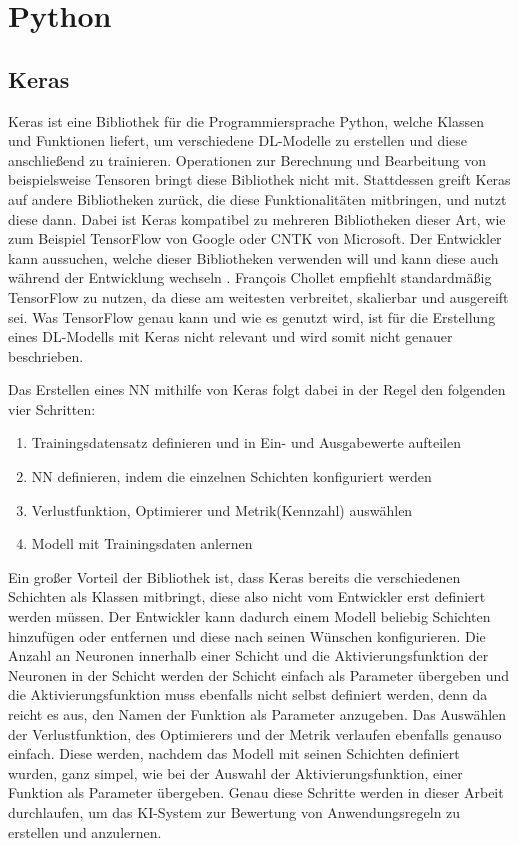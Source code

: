 \section{Python}
\label{chap:Python}


\subsection{Keras}
Keras ist eine Bibliothek für die Programmiersprache Python, welche Klassen und Funktionen liefert, um verschiedene \ac{DL}-Modelle zu erstellen
und diese anschließend zu trainieren. Operationen zur Berechnung und Bearbeitung von beispielsweise Tensoren bringt diese Bibliothek nicht mit.
Stattdessen greift Keras auf andere Bibliotheken zurück, die diese Funktionalitäten mitbringen, und nutzt diese dann. Dabei ist Keras kompatibel zu mehreren
Bibliotheken dieser Art, wie zum Beispiel TensorFlow von Google oder CNTK von Microsoft. Der Entwickler kann aussuchen, welche dieser Bibliotheken
verwenden will und kann diese auch während der Entwicklung wechseln \cite[vgl. S.89ff.]{DL_PY}. François Chollet empfiehlt standardmäßig TensorFlow zu nutzen, da diese 
\glqq am weitesten verbreitet, skalierbar und ausgereift\grqq{}\cite[S.91]{DL_PY} sei. Was TensorFlow genau kann und wie es genutzt wird, ist für die Erstellung eines
\ac{DL}-Modells mit Keras nicht relevant und wird somit nicht genauer beschrieben.

Das Erstellen eines \ac{NN} mithilfe von Keras folgt dabei in der Regel den folgenden vier Schritten:
\begin{enumerate}
    \item Trainingsdatensatz definieren und in Ein- und Ausgabewerte aufteilen \cite[vgl. S.92.]{DL_PY}
    \item \ac{NN} definieren, indem die einzelnen Schichten konfiguriert werden \cite[vgl. S.92.]{DL_PY}
    \item Verlustfunktion, Optimierer und Metrik(Kennzahl) auswählen \cite[vgl. S.92.]{DL_PY}
    \item Modell mit Trainingsdaten anlernen \cite[vgl. S.92.]{DL_PY}
\end{enumerate}
Ein großer Vorteil der Bibliothek ist, dass Keras bereits die verschiedenen Schichten als Klassen mitbringt, diese also nicht vom Entwickler erst definiert werden müssen.
Der Entwickler kann dadurch einem Modell beliebig Schichten hinzufügen oder entfernen und diese nach seinen Wünschen konfigurieren. 
Die Anzahl an Neuronen innerhalb einer Schicht und die Aktivierungsfunktion der Neuronen in der Schicht werden der Schicht einfach als Parameter übergeben 
und die Aktivierungsfunktion muss ebenfalls nicht selbst definiert werden, denn da reicht es aus, den Namen der Funktion als Parameter anzugeben.
Das Auswählen der Verlustfunktion, des Optimierers und der Metrik verlaufen ebenfalls genauso einfach. Diese werden, nachdem das Modell mit seinen Schichten 
definiert wurden, ganz simpel, wie bei der Auswahl der Aktivierungsfunktion, einer Funktion als Parameter übergeben.
Genau diese Schritte werden in dieser Arbeit durchlaufen, um das \ac{KI}-System zur Bewertung von Anwendungsregeln zu erstellen und anzulernen.


